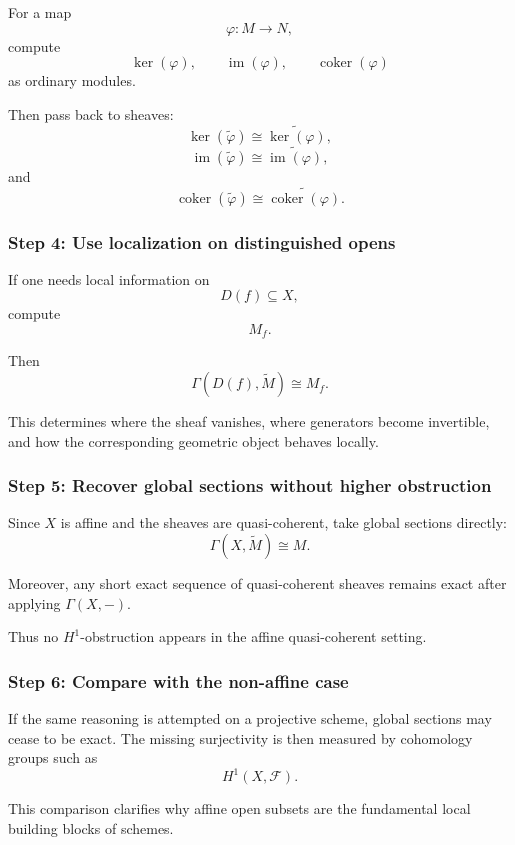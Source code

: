\documentclass[12pt,a4paper]{article}
\theoremstyle{notespace}
\begin{document}
For a map
\[
\varphi:M\longrightarrow N,
\]
compute
\[
\ker(\varphi),
\qquad
\operatorname{im}(\varphi),
\qquad
\operatorname{coker}(\varphi)
\]
as ordinary modules.

Then pass back to sheaves:
\[
\ker(\widetilde{\varphi})
\cong
\widetilde{\ker(\varphi)},
\]
\[
\operatorname{im}(\widetilde{\varphi})
\cong
\widetilde{\operatorname{im}(\varphi)},
\]
and
\[
\operatorname{coker}(\widetilde{\varphi})
\cong
\widetilde{\operatorname{coker}(\varphi)}.
\]

\subsubsection{Step 4: Use localization on distinguished opens}

If one needs local information on
\[
D(f)\subseteq X,
\]
compute
\[
M_{f}.
\]

Then
\[
\Gamma(D(f),\widetilde{M})
\cong
M_{f}.
\]

This determines where the sheaf vanishes, where generators become invertible,
and how the corresponding geometric object behaves locally.

\subsubsection{Step 5: Recover global sections without higher obstruction}

Since \(X\) is affine and the sheaves are quasi-coherent, take global
sections directly:
\[
\Gamma(X,\widetilde{M})\cong M.
\]

Moreover, any short exact sequence of quasi-coherent sheaves remains exact
after applying \(\Gamma(X,-)\).

Thus no \(H^{1}\)-obstruction appears in the affine quasi-coherent setting.

\subsubsection{Step 6: Compare with the non-affine case}

If the same reasoning is attempted on a projective scheme, global sections
may cease to be exact. The missing surjectivity is then measured by
cohomology groups such as
\[
H^{1}(X,\mathcal{F}).
\]

This comparison clarifies why affine open subsets are the fundamental local
building blocks of schemes.

\end{document}
